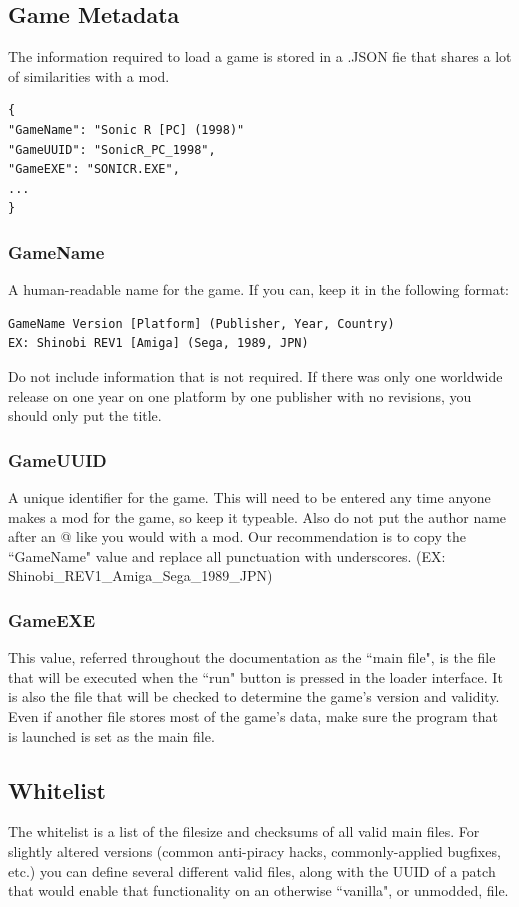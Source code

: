 \documentclass[12pt,a4paper,notitlepage]{article}
\begin{document}
\subsection{Game Metadata}
\label{subsec:games-meta}
The information required to load a game is stored in a .JSON fie that shares a lot of similarities with a mod.

\begin{lstlisting}[breaklines=true]
{
"GameName": "Sonic R [PC] (1998)"
"GameUUID": "SonicR_PC_1998",
"GameEXE": "SONICR.EXE",
...
}
\end{lstlisting}

\subsubsection{GameName}
A human-readable name for the game. If you can, keep it in the following format:

\begin{lstlisting}[breaklines=true]
GameName Version [Platform] (Publisher, Year, Country)
EX: Shinobi REV1 [Amiga] (Sega, 1989, JPN)
\end{lstlisting}

Do not include information that is not required. If there was only one worldwide release on one year on one platform by one publisher with no revisions, you should only put the title.

\subsubsection{GameUUID}
A unique identifier for the game. This will need to be entered any time anyone makes a mod for the game, so keep it typeable. Also do not put the author name after an @ like you would with a mod. Our recommendation is to copy the ``GameName" value and replace all punctuation with underscores. (EX: Shinobi\_REV1\_Amiga\_Sega\_1989\_JPN)

\subsubsection{GameEXE}
This value, referred throughout the documentation as the ``main file", is the file that will be executed when the ``run" button is pressed in the loader interface. It is also the file that will be checked to determine the game's version and validity. Even if another file stores most of the game's data, make sure the program that is launched is set as the main file.

\subsection{Whitelist}
The whitelist is a list of the filesize and checksums of all valid main files. For slightly altered versions (common anti-piracy hacks, commonly-applied bugfixes, etc.) you can define several different valid files, along with the UUID of a patch that would enable that functionality on an otherwise ``vanilla", or unmodded, file.
\end{document}
